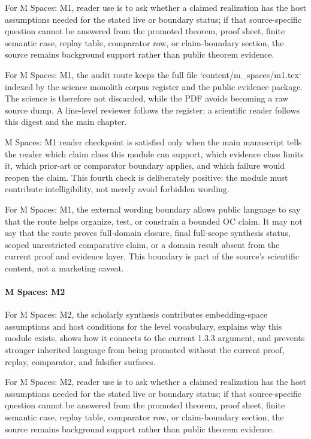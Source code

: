 For M Spaces: M1, reader use is to ask whether a claimed realization has the host assumptions needed for the stated live or boundary status; if that source-specific question cannot be answered from the promoted theorem, proof sheet, finite semantic case, replay table, comparator row, or claim-boundary section, the source remains background support rather than public theorem evidence.


For M Spaces: M1, the audit route keeps the full file `content/m\_spaces/m1.tex` indexed by the science monolith corpus register and the public evidence package. The science is therefore not discarded, while the PDF avoids becoming a raw source dump. A line-level reviewer follows the register; a scientific reader follows this digest and the main chapter.


M Spaces: M1 reader checkpoint is satisfied only when the main manuscript tells the reader which claim class this module can support, which evidence class limits it, which prior-art or comparator boundary applies, and which failure would reopen the claim. This fourth check is deliberately positive: the module must contribute intelligibility, not merely avoid forbidden wording.


For M Spaces: M1, the external wording boundary allows public language to say that the route helps organize, test, or constrain a bounded OC claim. It may not say that the route proves full-domain closure, final full-scope synthesis status, scoped unrestricted comparative claim, or a domain result absent from the current proof and evidence layer. This boundary is part of the source's scientific content, not a marketing caveat.


\paragraph{M Spaces: M2}

For M Spaces: M2, the scholarly synthesis contributes embedding-space assumptions and host conditions for the level vocabulary, explains why this module exists, shows how it connects to the current 1.3.3 argument, and prevents stronger inherited language from being promoted without the current proof, replay, comparator, and falsifier surfaces.


For M Spaces: M2, reader use is to ask whether a claimed realization has the host assumptions needed for the stated live or boundary status; if that source-specific question cannot be answered from the promoted theorem, proof sheet, finite semantic case, replay table, comparator row, or claim-boundary section, the source remains background support rather than public theorem evidence.



